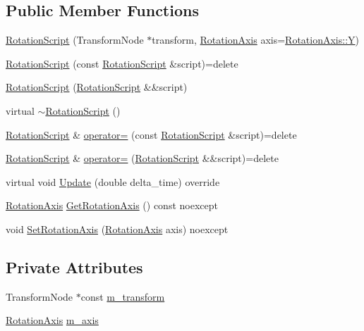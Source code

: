 \subsection*{Public Member Functions}
\begin{DoxyCompactItemize}
\item 
\hyperlink{classmage_1_1_rotation_script_a731c7c3dbe7064fe876f80307952b595}{Rotation\+Script} (Transform\+Node $\ast$transform, \hyperlink{classmage_1_1_rotation_script_ad06cf896ce6dfe4f6676b263d15b4ee9}{Rotation\+Axis} axis=\hyperlink{classmage_1_1_rotation_script_ad06cf896ce6dfe4f6676b263d15b4ee9a57cec4137b614c87cb4e24a3d003a3e0}{Rotation\+Axis\+::Y})
\item 
\hyperlink{classmage_1_1_rotation_script_a52ee0473609565766fc1153678ee8b60}{Rotation\+Script} (const \hyperlink{classmage_1_1_rotation_script}{Rotation\+Script} \&script)=delete
\item 
\hyperlink{classmage_1_1_rotation_script_a5c6464f8e38fde0442c3b6f49a9cbed1}{Rotation\+Script} (\hyperlink{classmage_1_1_rotation_script}{Rotation\+Script} \&\&script)
\item 
virtual \hyperlink{classmage_1_1_rotation_script_adc2af2d6ed93558fd66b569297b294d0}{$\sim$\+Rotation\+Script} ()
\item 
\hyperlink{classmage_1_1_rotation_script}{Rotation\+Script} \& \hyperlink{classmage_1_1_rotation_script_a738c666a1aa42412da82d24368b20dfe}{operator=} (const \hyperlink{classmage_1_1_rotation_script}{Rotation\+Script} \&script)=delete
\item 
\hyperlink{classmage_1_1_rotation_script}{Rotation\+Script} \& \hyperlink{classmage_1_1_rotation_script_a093aa3f50dcbbe68847bb0b5f6363e7a}{operator=} (\hyperlink{classmage_1_1_rotation_script}{Rotation\+Script} \&\&script)=delete
\item 
virtual void \hyperlink{classmage_1_1_rotation_script_a96936107b1b955cce5e84b8081f930bb}{Update} (double delta\+\_\+time) override
\item 
\hyperlink{classmage_1_1_rotation_script_ad06cf896ce6dfe4f6676b263d15b4ee9}{Rotation\+Axis} \hyperlink{classmage_1_1_rotation_script_a6fbbbec1bd610da2c917d1ef2d05f556}{Get\+Rotation\+Axis} () const noexcept
\item 
void \hyperlink{classmage_1_1_rotation_script_a32c12db9206002a1aa2dd0e2e3b4ecd7}{Set\+Rotation\+Axis} (\hyperlink{classmage_1_1_rotation_script_ad06cf896ce6dfe4f6676b263d15b4ee9}{Rotation\+Axis} axis) noexcept
\end{DoxyCompactItemize}
\subsection*{Private Attributes}
\begin{DoxyCompactItemize}
\item 
Transform\+Node $\ast$const \hyperlink{classmage_1_1_rotation_script_a9dd84c2b928dece60bc1d72a16b20030}{m\+\_\+transform}
\item 
\hyperlink{classmage_1_1_rotation_script_ad06cf896ce6dfe4f6676b263d15b4ee9}{Rotation\+Axis} \hyperlink{classmage_1_1_rotation_script_a8fb1d0fb6e3dac1dd91f2d16e1954f21}{m\+\_\+axis}
\end{DoxyCompactItemize}
